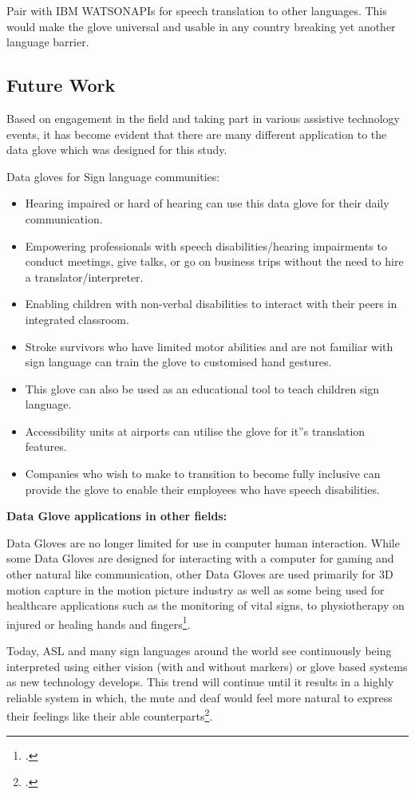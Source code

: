 Pair with IBM WATSON\texttrademark APIs for speech translation to other languages. This would make the glove universal and usable in any country breaking yet another language barrier.

\subsection{Future Work}

Based on engagement in the field and taking part in various assistive technology events, it has become evident that there are many different application to the data glove which was designed for this study.

Data gloves for Sign language communities:

\begin{itemize}
    \item Hearing impaired or hard of hearing can use this data glove for their daily communication. 
    \item Empowering professionals with speech disabilities/hearing impairments to conduct meetings, give talks, or go on business trips without the need to hire a translator/interpreter. 
    \item Enabling children with non-verbal disabilities to interact with their peers in integrated classroom. 
    \item Stroke survivors who have limited motor abilities and are not familiar with sign language can train the glove to customised hand gestures. 
    \item This glove can also be used as an educational tool to teach children sign language. 
    \item Accessibility units at airports can utilise the glove for it''s translation features.
    \item Companies who wish to make to transition to become fully inclusive can provide the glove to enable their employees who have speech disabilities. 
\end{itemize}

\textbf{Data Glove applications in other fields:}

Data Gloves are no longer limited for use in computer human interaction. While some Data Gloves are designed for interacting with a computer for gaming and other natural like communication, other Data Gloves are used primarily for 3D motion capture in the motion picture industry as well as some being used for healthcare applications such as the monitoring of vital signs, to physiotherapy on injured or healing hands and fingers\footcite{Premaratne2010}. 

Today, ASL and many sign languages around the world see continuously being interpreted using either vision (with and without markers) or glove based systems as new technology develops. This trend will continue until it results in a highly reliable system in which, the mute and deaf would feel more natural to express their feelings like their able counterparts\footcite{Pavlovic1997}.





